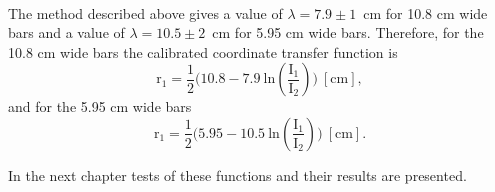 \documentclass[a4paper]{article}\linespread{1.4}
\begin{document}
\\The method described above gives a value of $\lambda=7.9\pm1$~cm for 10.8 cm wide bars and a value of $\lambda=10.5\pm2$~cm for 5.95 cm wide bars. 
Therefore, for the 10.8 cm wide bars the calibrated coordinate transfer function is
\begin{equation} \label{eq:pos11} \mathrm{ r_{1}=\frac{1}{2} \Big(10.8 - 7.9~ln(\frac{I_{1}}{I_{2}})\Big) \ [cm],} \end{equation}
and for the 5.95 cm wide bars
\begin{equation} \label{eq:pos12} \mathrm{ r_{1}=\frac{1}{2} \Big(5.95 - 10.5~ln(\frac{I_{1}}{I_{2}})\Big) \ [cm].} \end{equation}

In the next chapter tests of these functions and their results are presented.
\end{document}
